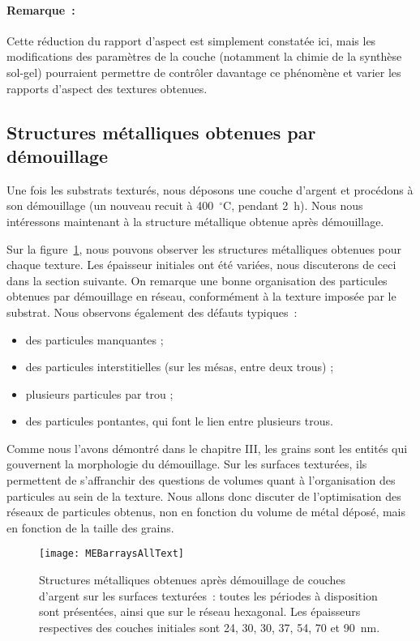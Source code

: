 \paragraph*{Remarque~:} Cette réduction du rapport d'aspect est simplement constatée ici, mais les modifications des paramètres de la couche (notamment la chimie de la synthèse sol-gel) pourraient permettre de contrôler davantage ce phénomène et varier les rapports d'aspect des textures obtenues.\par 

	\subsection{Structures métalliques obtenues par démouillage}
Une fois les substrats texturés, nous déposons une couche d’argent et procédons à son démouillage (un nouveau recuit à 400~$^\circ$C, pendant 2~h). Nous nous intéressons maintenant à la structure métallique obtenue après démouillage.\par 
Sur la figure~\ref{MEBarraysAllText}, nous pouvons observer les structures métalliques obtenues pour chaque texture. Les épaisseur initiales ont été variées, nous discuterons de ceci dans la section suivante. On remarque une bonne organisation des particules obtenues par démouillage en réseau, conformément à la texture imposée par le substrat. Nous observons également des défauts typiques~:
\begin{itemize}
\item des particules manquantes ;
\item des particules interstitielles (sur les mésas, entre deux trous) ;
\item plusieurs particules par trou ;
\item des particules pontantes, qui font le lien entre plusieurs trous.
\end{itemize}
Comme nous l'avons démontré dans le chapitre III, les grains sont les entités qui gouvernent la morphologie du démouillage. Sur les surfaces texturées, ils permettent de s'affranchir des questions de volumes quant à l'organisation des particules au sein de la texture. Nous allons donc discuter de l'optimisation des réseaux de particules obtenus, non en fonction du volume de métal déposé, mais en fonction de la taille des grains.\par 
\begin{figure}[!htb]
\centering
\texttt{[image: MEBarraysAllText]}
\caption{Structures métalliques obtenues après démouillage de couches d’argent sur les surfaces texturées~: toutes les périodes à disposition sont présentées, ainsi que sur le réseau hexagonal. Les épaisseurs respectives des couches initiales sont 24, 30, 30, 37, 54, 70 et 90~nm.}
\label{MEBarraysAllText}
\end{figure}


